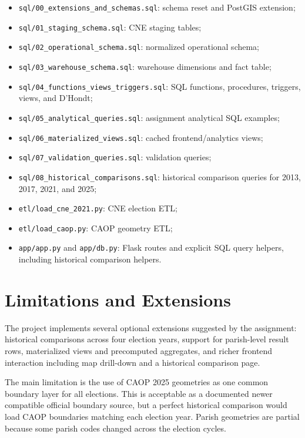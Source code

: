 \documentclass[11pt,twocolumn]{article}
\begin{document}
\begin{itemize}
  \item \texttt{sql/00\_extensions\_and\_schemas.sql}: schema reset and PostGIS extension;
  \item \texttt{sql/01\_staging\_schema.sql}: CNE staging tables;
  \item \texttt{sql/02\_operational\_schema.sql}: normalized operational schema;
  \item \texttt{sql/03\_warehouse\_schema.sql}: warehouse dimensions and fact table;
  \item \texttt{sql/04\_functions\_views\_triggers.sql}: SQL functions, procedures, triggers, views, and D'Hondt;
  \item \texttt{sql/05\_analytical\_queries.sql}: assignment analytical SQL examples;
  \item \texttt{sql/06\_materialized\_views.sql}: cached frontend/analytics views;
  \item \texttt{sql/07\_validation\_queries.sql}: validation queries;
  \item \texttt{sql/08\_historical\_comparisons.sql}: historical comparison queries for 2013, 2017, 2021, and 2025;
  \item \texttt{etl/load\_cne\_2021.py}: CNE election ETL;
  \item \texttt{etl/load\_caop.py}: CAOP geometry ETL;
  \item \texttt{app/app.py} and \texttt{app/db.py}: Flask routes and explicit SQL query helpers, including historical comparison helpers.
\end{itemize}

\section{Limitations and Extensions}

The project implements several optional extensions suggested by the assignment: historical comparisons across four election years, support for parish-level result rows, materialized views and precomputed aggregates, and richer frontend interaction including map drill-down and a historical comparison page.

The main limitation is the use of CAOP 2025 geometries as one common boundary layer for all elections. This is acceptable as a documented newer compatible official boundary source, but a perfect historical comparison would load CAOP boundaries matching each election year. Parish geometries are partial because some parish codes changed across the election cycles.
\end{document}
